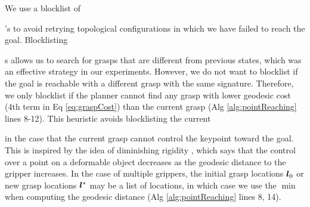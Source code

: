 We use a blocklist of \signature{}'s to avoid retrying topological configurations in which we have failed to reach the goal. Blocklisting \signature{}s allows us to search for grasps that are different from previous states, which was an effective strategy in our experiments. However, we do not want to blocklist if the goal is reachable with a different grasp with the same signature. Therefore, we only blocklist if the planner cannot find any grasp with lower geodesic cost (4th term in Eq \eqref{eq:graspCost}) than the current grasp (Alg \ref{alg:pointReaching} lines 8-12). This heuristic avoids blocklisting the current \signature{} in the case that the current grasp cannot control the keypoint toward the goal. This is inspired by the idea of diminishing rigidity \cite{DiminishingRigidity}, which says that the control over a point on a deformable object decreases as the geodesic distance to the gripper increases. In the case of multiple grippers, the initial grasp locations $\bm{l}_0$ or new grasp locations $\bm{l}^*$ may be a list of locations, in which case we use the $\min$ when computing the geodesic distance (Alg \ref{alg:pointReaching} lines 8, 14).

